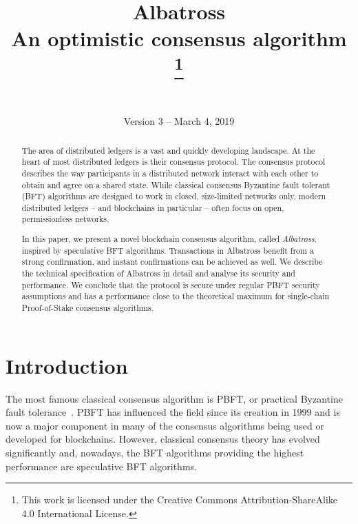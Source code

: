 \documentclass[conference]{IEEEtran}
\begin{document}
\title{Albatross\\
	\large An optimistic consensus algorithm
	\thanks{This work is licensed under the Creative Commons Attribution-ShareAlike 4.0 International License.}
}

\author{
		\\\\Version 3 -- March 4, 2019
}

\maketitle
\thispagestyle{plain} %
\pagestyle{plain} %

\begin{abstract}
The area of distributed ledgers is a vast and quickly developing landscape. At the heart of most distributed ledgers is their consensus protocol. The consensus protocol describes the way participants in a distributed network interact with each other to obtain and agree on a shared state. While classical consensus Byzantine fault tolerant (BFT) algorithms are designed to work in closed, size-limited networks only, modern distributed ledgers -- and blockchains in particular -- often focus on open, permissionless networks.

In this paper, we present a novel blockchain consensus algorithm, called \textit{Albatross}, inspired by speculative BFT algorithms. Transactions in Albatross benefit from a strong confirmation, and instant confirmations can be achieved as well. We describe the technical specification of Albatross in detail and analyse its security and performance. We conclude that the protocol is secure under regular PBFT security assumptions and has a performance close to the theoretical maximum for single-chain Proof-of-Stake consensus algorithms.
\end{abstract}

\section{Introduction}
The most famous classical consensus algorithm is PBFT, or practical Byzantine fault tolerance~\cite{castro1999practical}. PBFT has influenced the field since its creation in 1999 and is now a major component in many of the consensus algorithms being used or developed for blockchains. However, classical consensus theory has evolved significantly and, nowadays, the BFT algorithms providing the highest performance are speculative BFT algorithms.
\end{document}
